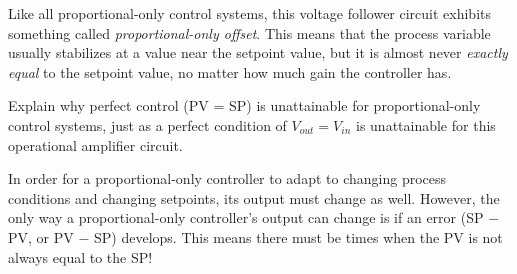 Like all proportional-only control systems, this voltage follower circuit exhibits something called {\it proportional-only offset}.  This means that the process variable usually stabilizes at a value near the setpoint value, but it is almost never {\it exactly equal} to the setpoint value, no matter how much gain the controller has.

Explain why perfect control (PV = SP) is unattainable for proportional-only control systems, just as a perfect condition of $V_{out} = V_{in}$ is unattainable for this operational amplifier circuit.







In order for a proportional-only controller to adapt to changing process conditions and changing setpoints, its output must change as well.  However, the only way a proportional-only controller's output can change is if an error (SP $-$ PV, or PV $-$ SP) develops.  This means there must be times when the PV is not always equal to the SP!












